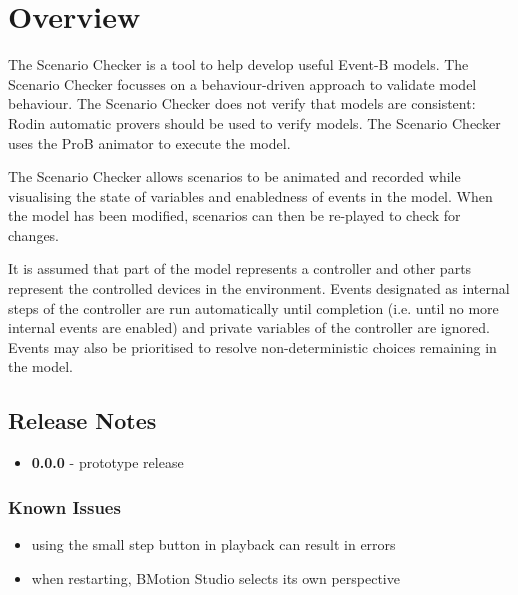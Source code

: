 \section{Overview}
\label{sec:overview}

The Scenario Checker is a tool to help develop useful Event-B models.
The Scenario Checker focusses on a behaviour-driven approach to validate model behaviour.
The Scenario Checker does not verify that models are consistent: Rodin automatic provers should be used to verify models.
The Scenario Checker uses the ProB animator to execute the model.

The Scenario Checker allows scenarios to be animated and recorded while visualising the state of variables and enabledness of events in the model.
When the model has been modified, scenarios can then be re-played to check for changes.

It is assumed that part of the model represents a controller and other parts represent the controlled devices in the environment.
Events designated as internal steps of the controller are run automatically until completion (i.e. until no more internal events are enabled) and private variables of the controller are ignored.
Events may also be prioritised to resolve non-deterministic choices remaining in the model.

\subsection{Release Notes}
\label{sec:release-notes}

\begin{itemize}
	\item \textbf{0.0.0} - prototype release
\end{itemize}

\subsubsection{Known Issues}
\label{sec:known-issues}

\begin{itemize}
	\item using the small step button in playback can result in errors
	\item when restarting, BMotion Studio selects its own perspective
\end{itemize}


